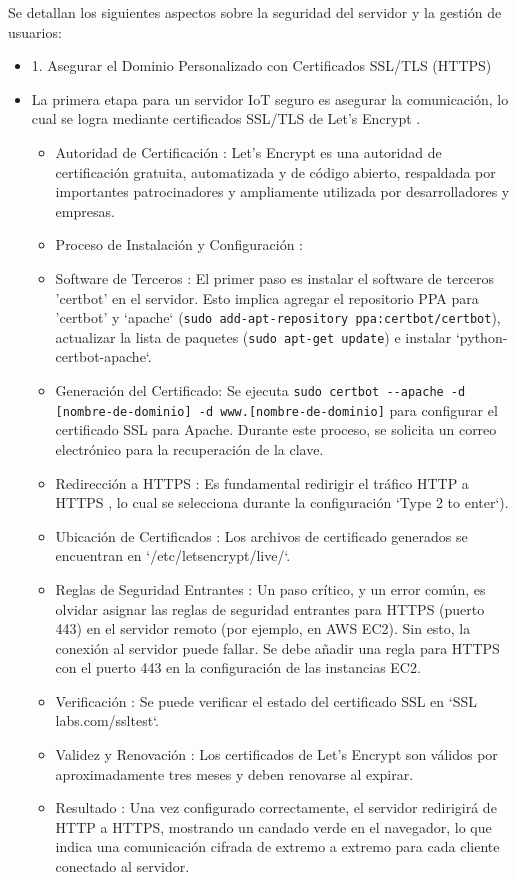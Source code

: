 \documentclass{report}
\begin{document}
Se detallan los siguientes aspectos sobre la seguridad del servidor y la gestión de usuarios:
\begin{itemize}
    \item 1. Asegurar el Dominio Personalizado con Certificados SSL/TLS (HTTPS)
    \item La primera etapa para un servidor IoT seguro es asegurar la comunicación, lo cual se logra mediante certificados  SSL/TLS de Let's Encrypt .
    \begin{itemize}
        \item Autoridad de Certificación : Let's Encrypt es una autoridad de certificación gratuita, automatizada y de código abierto, respaldada por 
        importantes patrocinadores y ampliamente utilizada por desarrolladores y empresas.
        \item Proceso de Instalación y Configuración :
        \item Software de Terceros : El primer paso es instalar el software de terceros 'certbot' en el servidor. Esto implica agregar el repositorio PPA 
        para 'certbot' y `apache` (\verb|sudo add-apt-repository ppa:certbot/certbot|), actualizar la lista de paquetes (\verb|sudo apt-get update|) e 
        instalar `python-certbot-apache`.
        \item Generación del Certificado: Se ejecuta  \verb|sudo certbot --apache -d [nombre-de-dominio] -d www.[nombre-de-dominio]| para configurar el 
        certificado SSL para Apache. Durante este proceso, se solicita un correo electrónico para la recuperación de la clave.
        \item Redirección a HTTPS : Es fundamental  redirigir el tráfico HTTP a HTTPS , lo cual se selecciona durante la configuración 
        `Type 2 to enter`).
        \item Ubicación de Certificados : Los archivos de certificado generados se encuentran en `/etc/letsencrypt/live/`.
        \item Reglas de Seguridad Entrantes : Un paso crítico, y un error común, es olvidar asignar las  reglas de seguridad entrantes para HTTPS 
        (puerto 443)  en el servidor remoto (por ejemplo, en AWS EC2). Sin esto, la conexión al servidor puede fallar. Se debe añadir una regla para 
        HTTPS con el puerto 443 en la configuración de las instancias EC2.
        \item Verificación : Se puede verificar el estado del certificado SSL en `SSL labs.com/ssltest`.
        \item Validez y Renovación : Los certificados de Let's Encrypt son válidos por aproximadamente tres meses y deben renovarse al expirar.
        \item Resultado : Una vez configurado correctamente, el servidor redirigirá de HTTP a HTTPS, mostrando un candado verde en el navegador, 
        lo que indica una  comunicación cifrada de extremo a extremo  para cada cliente conectado al servidor.
    \end{itemize}


\end{itemize}
\end{document}
